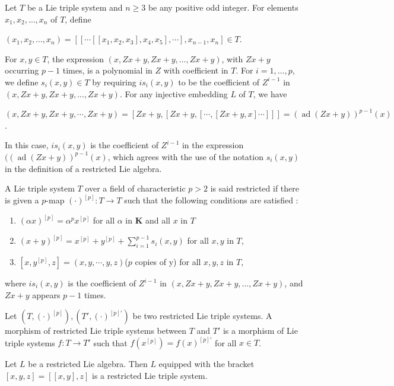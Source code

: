 \documentclass[11pt, twoside]{article}
\DeclareMathOperator{\ad}{ad}
\begin{document}
Let $T$ be a Lie triple system and $n\geq 3$ be any positive odd integer. For elements $x_1,x_2,\dots , x_n $ of $T$, define \begin{center}
    $(x_1,x_2,\dots,x_n)= [[\cdots [[x_1,x_2,x_3],x_4,x_5],\cdots],x_{n-1},x_n] \in T$.
\end{center} For $x,y\in T $, the expression $(x,Zx+y,Zx+y,\dots , Zx+y) $,  with $Zx+y$ occurring $p-1$ times, is a polynomial in $Z$ with coefficient in $T$. For $i=1,\dots,p $, we define $s_i(x,y) \in T$ by requiring $is_i(x,y)$ to be the coefficient of $Z^{i-1} $ in $(x,Zx+y,Zx+y,\dots,Zx+y) $. For any injective embedding $L$ of $T$, we have \begin{center}
    $(x,Zx+y,Zx+y,\cdots,Zx+y)= [Zx+y,[Zx+y,[\cdots ,[Zx+y,x]\cdots]]] = (\ad(Zx+y))^{p-1}(x) $.
\end{center} In this case, $is_i(x,y) $ is the coefficient of $Z^{i-1} $ in the expression $((\ad(Zx+y))^{p-1}(x) $, which agrees with the use of the notation $s_i(x,y) $ in the definition of a restricted Lie algebra. 

\begin{defi}\label{D5.1}
    A Lie triple system $T$ over a field of characteristic $p>2$ is said restricted if there is given a $p$-map $(\cdot)^{[p]}:T\to T $  such that the following conditions are satisfied : \begin{enumerate}        
        \item $(\alpha x)^{[p]}= \alpha^p x^{[p]} $ for all $\alpha$ in $\mathbf{K}$ and all $x$ in $T$
        \item $(x+y)^{[p]}= x^{[p]}+y^{[p]}+ \sum\limits_{i=1}^{p-1}s_i(x,y) $ for all $x,y$ in $T$,
        \item  $[x,y^{[p]},z]=(x,y,\cdots,y,z) $($p$ copies of y) for all $x,y,z$ in $T$,
    \end{enumerate} where $is_i(x,y)$ is the coefficient of $Z^{i-1} $ in $(x,Zx+y,Zx+y,\dots,Zx+y) $, and $Zx+y $ appears $p-1$ times.
\end{defi}

\begin{defi}
    Let $(T,(\cdot)^{[p]}), (T',(\cdot)^{[p]'})$ be two restricted Lie triple systems. A morphism of restricted Lie triple systems between $T$ and $T'$ is a morphism of Lie triple systems $f:T\to T' $ such that $f(x^{[p]})=f(x)^{[p]'} $ for all $x\in T$.
\end{defi}

\begin{ex}
    Let $L$ be a restricted Lie algebra. Then $L$ equipped with the bracket $[x,y,z]=[[x,y],z] $ is a restricted Lie triple system. 
\end{ex}
\end{document}
